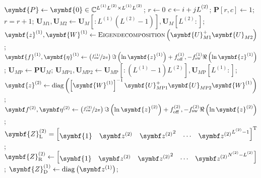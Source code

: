 \begin{algorithm}[h!]
\begin{algorithmic}[1]
        \State $\symbf{P} \gets \symbf{0} \in \mathbb{C}^{\Lone \Ltwo \times \Lone \Ltwo}$;
        \State $r \gets 0$
                \State $c \gets i + j \Ltwo$;
                \State $\symbf{P}\left[r, c\right] \gets 1$;
                \State $r = r + 1$;
            \EndFor
        \EndFor
        \State $\symbf{U}_{M1}, \symbf{U}_{M2} \gets \symbf{U}_M\left[ : L^{(1)}(L^{(2)}-1)\right], \symbf{U}_M\left[L^{(2)}:\right]$;
        \State $\symbf{z}^{(1)}, \symbf{W}^{(1)} \gets \textsc{Eigendecomposition}\left( \symbf{U}_{M1}^+ \symbf{U}_{M2}^{\vphantom{+}} \right)$;
        \State $
            \symbf{f}^{(1)},
            \symbf{\eta}^{(1)} \gets
            \left(
                \nicefrac{f_{\text{sw}}^{(1)}}{2 \pi}
            \right)
            \Im \left( \ln \symbf{z}^{(1)} \right) + \foffone,
            -\fswone \Re \left( \ln \symbf{z}^{(1)} \right)
        $;
        \State $\symbf{U}_{M\text{P}} \gets \symbf{P} \symbf{U}_M$;
        \State $
            \symbf{U}_{M\text{P}1},
            \symbf{U}_{M \text{P} 2} \gets
            \symbf{U}_{M \text{P}}\left[ : (L^{(1)}-1)L^{(2)}\right],
            \symbf{U}_{M \text{P}}\left[L^{(1)}:\right]
        $;
        \State $
            \symbf{z}^{(2)} \gets \operatorname{diag} \left(
                \left[\symbf{W}^{(1)}\right]^{-1}
                \symbf{U}_{M\text{P}1}^{+}
                \symbf{U}_{M\text{P}2}^{\vphantom{+}}
                \symbf{W}^{(1)}
            \right)$;
        \State $
            \bdftwo,
            \bdetatwo \gets
            \left(
                \nicefrac{\fswtwo}{2 \pi}
            \right)
            \Im \left( \ln \symbf{z}^{(2)} \right) + \fofftwo,
            -\fswtwo \Re \left( \ln \symbf{z}^{(2)} \right)
        $;
        \State $
        \symbf{Z}^{(2)}_{\text{L}} =
        \begin{bmatrix}
            \symbf{1} &
            \bdztwo &
            {\bdztwo}^2 &
            \cdots &
            {\bdztwo}^{\Ltwo-1}
        \end{bmatrix}\T
        $;
        \State $
            \symbf{Z}^{(2)}_{\text{R}} \gets
            \begin{bmatrix}
                \symbf{1} & \bdztwo & {\bdztwo}^2 & \cdots & {\bdztwo}^{\Ntwo - \Ltwo}
            \end{bmatrix}
        $;
        \State $\symbf{Z}^{(1)}_{\text{D}} \gets \diag\left(\bdzone\right)$;

\end{algorithmic}
\end{algorithm}
